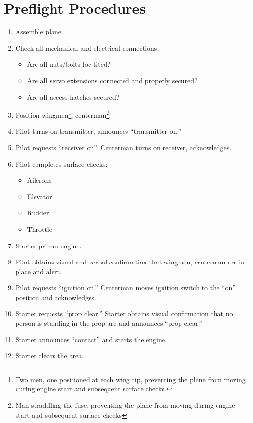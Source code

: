 \documentclass[10pt,twocolumns]{report}
\newcommand{\itemspace}{	\setlength{\itemsep}{0cm} \setlength{\parskip}{0cm}}
\begin{document}
\newpage
\appendix
\renewcommand\thesection{Appendix \Alph{section}}
\section{Preflight Procedures}
\label{sec:appendix_preflight}
\begin{enumerate}
	\setlength{\itemsep}{0cm}
	\setlength{\parskip}{0cm}
	\item Assemble plane.
	\item Check all mechanical and electrical connections.
		\begin{itemize}
		\itemspace
		\item Are all nuts/bolts loc-tited?
		\item Are all servo extensions connected and properly secured?
		\item Are all access hatches secured?
		\end{itemize}
	\item Position wingmen\footnote{Two men, one positioned at each wing tip, preventing the plane from moving during engine start and subsequent surface checks.}, centerman\footnote{Man straddling the fuse, preventing the plane from moving during engine start and subsequent surface checks}.
	\item Pilot turns on transmitter, announces ``transmitter on.''
	\item Pilot requests ``receiver on''.  Centerman turns on receiver, acknowledges.
	\item Pilot completes surface checks:
		\begin{itemize}
		\itemspace
		\item Ailerons
		\item Elevator
		\item Rudder
		\item Throttle
		\end{itemize}
	\item Starter primes engine.
	\item Pilot obtains visual and verbal confirmation that wingmen, centerman are in place and alert.
	\item Pilot requests ``ignition on.''  Centerman moves ignition switch to the ``on'' position and acknowledges.
	\item Starter requests ``prop clear.''  Starter obtains visual confirmation that no person is standing in the prop arc and announces ``prop clear.''
	\item Starter announces ``contact'' and starts the engine.
	\item Starter clears the area.

\end{enumerate}
\end{document}
